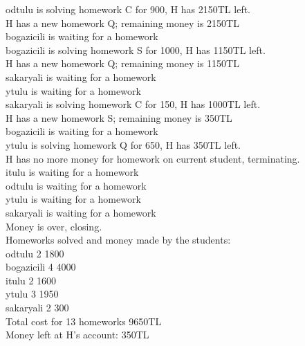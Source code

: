 \documentclass{article}
\begin{document}
odtulu is solving homework C for 900, H has 2150TL left.\\
H has a new homework Q; remaining money is 2150TL\\
bogazicili is waiting for a homework\\
bogazicili is solving homework S for 1000, H has 1150TL left.\\
H has a new homework Q; remaining money is 1150TL\\
sakaryali is waiting for a homework\\
ytulu is waiting for a homework\\
sakaryali is solving homework C for 150, H has 1000TL left.\\
H has a new homework S; remaining money is 350TL\\
bogazicili is waiting for a homework\\
ytulu is solving homework Q for 650, H has 350TL left.\\
H has no more money for homework on current student, terminating.\\
itulu is waiting for a homework\\
odtulu is waiting for a homework\\
ytulu is waiting for a homework\\
sakaryali is waiting for a homework\\
Money is over, closing.\\
Homeworks solved and money made by the students:\\
odtulu                   2       1800\\
bogazicili               4       4000\\
itulu                    2       1600\\
ytulu                    3       1950\\
sakaryali                2       300\\
Total cost for 13 homeworks 9650TL\\
Money left at H’s account: 350TL\\
\end{document}
